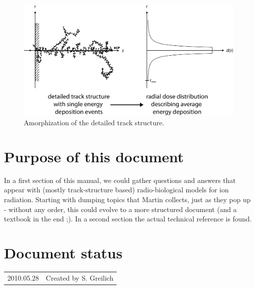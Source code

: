 \begin{figure}
	\centering
		\includegraphics[width=1.0\textwidth]{pictures/TrackStructureDetailAndRDD.png}
	\caption{Amorphization of the detailed track structure.}
	\label{fig:TST}
\end{figure}




\section{Purpose of this document}
In a first section of this manual, we could gather questions and answers that
appear with (mostly track-structure based) radio-biological models for ion radiation. Starting with dumping topics that Martin collects, just as they pop up - without any order, this could evolve to a more structured document (and a textbook in the end ;).
In a second section the actual technical reference is found.



\section*{Document status}
\begin{tabular}{l l}
2010.05.28&Created by S. Greilich
\end{tabular}